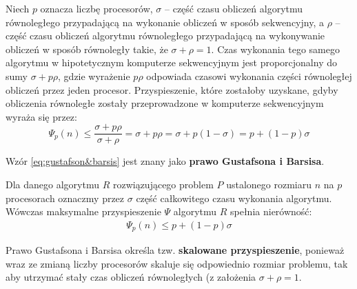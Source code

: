 Niech \(p\) oznacza liczbę procesorów, \(\sigma\) -- część czasu obliczeń algorytmu równoległego przypadającą na wykonanie obliczeń w sposób sekwencyjny, a \(\rho\) -- część czasu obliczeń algorytmu równoległego przypadającą na wykonywanie obliczeń w sposób równoległy takie, że \(\sigma+\rho=1\). Czas wykonania tego samego algorytmu w hipotetycznym komputerze sekwencyjnym jest proporcjonalny do sumy \(\sigma + p\rho\), gdzie wyrażenie \(p\rho\) odpowiada czasowi wykonania części równoległej obliczeń przez jeden procesor. Przyspieszenie, które zostałoby uzyskane, gdyby obliczenia równoległe zostały przeprowadzone w komputerze sekwencyjnym wyraża się przez:
\begin{equation}\label{eq:gustafson&barsis}
\Psi_{p}(n)\leq\frac{\sigma+p\rho}{\sigma+\rho}=\sigma+p\rho=\sigma+p\left(1-\sigma\right)=p+\left(1-p\right)\sigma
\end{equation}

Wzór \eqref{eq:gustafson&barsis} jest znany jako \textbf{prawo Gustafsona i	Barsisa}. 

\begin{definicja}
Dla danego algorytmu \(R\) rozwiązującego problem \(P\) ustalonego rozmiaru \(n\) na \(p\) procesorach oznaczmy przez \(\sigma\) część całkowitego czasu wykonania algorytmu. Wówczas maksymalne przyspieszenie \(\Psi\) algorytmu \(R\) spełnia nierówność:
\begin{align*}
\Psi_{p}(n) \leq p + (1-p)\sigma
\end{align*}
\end{definicja}
\begin{uwaga}
Prawo Gustafsona i Barsisa określa tzw. \textbf{skalowane przyspieszenie}, ponieważ wraz ze zmianą liczby procesorów skaluje się odpowiednio rozmiar problemu, tak aby utrzymać stały czas obliczeń równoległych (z założenia \(\sigma + \rho = 1\)\cite{Czech}.
\end{uwaga}